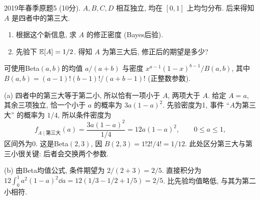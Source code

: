 \begin{exercise}\label{m2:2019s:q5}
2019年春季原题5 (10分). $A,B,C,D$ 相互独立, 均在 $[0,1]$ 上均匀分布. 后来得知 $A$ 是四者中的第三大.
\begin{enumerate}
\item[(a)]\label{m2:2019s:q5:a} 根据这个新信息, 求 $A$ 的修正密度 (Bayes后验).
\item[(b)]\label{m2:2019s:q5:b} 先验下 $\mathbb E[A]=1/2$. 得知 $A$ 为第三大后, 修正后的期望是多少?
\end{enumerate}
可使用Beta$(a,b)$的均值 $a/(a+b)$ 与密度 $x^{a-1}(1-x)^{b-1}/B(a,b)$, 其中 $B(a,b)=(a-1)!(b-1)!/(a+b-1)!$ (正整数参数).
\end{exercise}
\begin{solution}
(a) 四者中的第三大等于第二小, 所以恰有一项小于 $A$, 两项大于 $A$. 给定 $A=a$, 其余三项独立, 恰一个小于 $a$ 的概率为 $3a(1-a)^2$. 先验密度为1, 事件 ``$A$为第三大'' 的概率为 $1/4$, 所以条件密度为
\[
f_{A\mid\text{第三大}}(a)=\frac{3a(1-a)^2}{1/4}=12a(1-a)^2,\qquad0\le a\le1,
\]
区间外为0. 这是Beta$(2,3)$, 因 $B(2,3)=1!2!/4!=1/12$. 此处区分第三大与第三小很关键: 后者会交换两个参数.

(b) 由Beta均值公式, 条件期望为 $2/(2+3)=2/5$. 直接积分为 $12\int_0^1a^2(1-a)^2\dd a=12(1/3-1/2+1/5)=2/5$. 比先验均值略低, 与其为第二小相符.
\end{solution}

